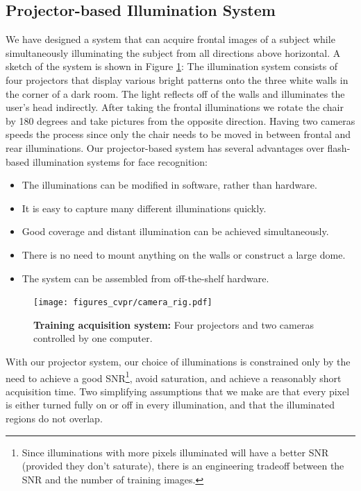 \documentclass[12pt,journal,draftcls,letterpaper,onecolumn]{IEEEtran}
\begin{document}
\subsection{Projector-based Illumination System} 

We have designed a system that can acquire frontal images of a subject while
simultaneously illuminating the subject from all directions above horizontal. A sketch of the
system is shown in Figure \ref{fig:system}: The illumination
system consists of four projectors that display various bright
patterns onto the three white walls in the corner of a dark
room.  The light reflects off of the walls and illuminates the
user's head indirectly.  After taking the frontal illuminations
we rotate the chair by 180 degrees and take pictures from the
opposite direction.  Having two cameras speeds the process
since only the chair needs to be moved in between frontal and
rear illuminations. Our projector-based system has several
advantages over flash-based illumination systems for face recognition:
\begin{itemize}
\item The illuminations can be modified in software, rather than hardware.
\item It is easy to capture many different illuminations quickly.
\item Good coverage and distant illumination can be achieved simultaneously.
\item There is no need to mount anything on the walls or construct a large dome.
\item The system can be assembled from off-the-shelf hardware.
\end{itemize}
\begin{figure}
\centerline{\hspace{-0.1in}\texttt{[image: figures\_cvpr/camera\_rig.pdf]}\vspace{-.2in}}
\caption{{\bf Training acquisition system:} Four projectors and two cameras controlled by one computer.}
\vspace{-.3in}
\label{fig:system}
\end{figure}
With our projector system, our choice of illuminations is
constrained only by the need to achieve a good
SNR\footnote{Since illuminations with more pixels illuminated
will have a better SNR (provided they don't saturate), there is
an engineering tradeoff between the SNR and the number of
training images.}, avoid saturation, and achieve
a reasonably short acquisition time.  Two simplifying
assumptions that we make are that every pixel is either turned
fully on or off in every illumination, and that the illuminated
regions do not overlap.
\end{document}
